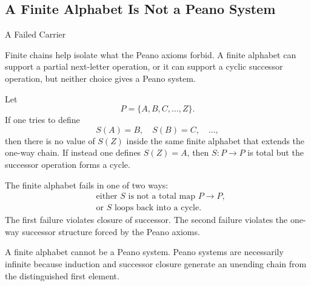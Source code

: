 \subsection*{A Finite Alphabet Is Not a Peano System}

\begin{topicbox}{A Failed Carrier}
\begin{exposition}
Finite chains help isolate what the Peano axioms forbid. A finite alphabet can
support a partial next-letter operation, or it can support a cyclic successor
operation, but neither choice gives a Peano system.
\end{exposition}

\begin{example*}
Let
\[
P=\{A,B,C,\ldots,Z\}.
\]
If one tries to define
\[
S(A)=B,\quad S(B)=C,\quad \ldots,
\]
then there is no value of $S(Z)$ inside the same finite alphabet that extends
the one-way chain. If instead one defines $S(Z)=A$, then $S:P\to P$ is total
but the successor operation forms a cycle.
\end{example*}

\begin{remark*}
The finite alphabet fails in one of two ways:
\[
\begin{aligned}
&\text{either } S \text{ is not a total map } P\to P,\\
&\text{or } S \text{ loops back into a cycle.}
\end{aligned}
\]
The first failure violates closure of successor. The second failure violates
the one-way successor structure forced by the Peano axioms.
\end{remark*}

\begin{remark*}[Interpretation]
A finite alphabet cannot be a Peano system. Peano systems are necessarily
infinite because induction and successor closure generate an unending chain
from the distinguished first element.
\end{remark*}
\end{topicbox}

